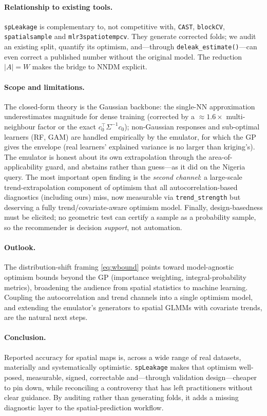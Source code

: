 \documentclass[11pt,a4paper]{article}
\begin{document}
\paragraph{Relationship to existing tools.} \texttt{spLeakage} is complementary to,
not competitive with, \texttt{CAST}, \texttt{blockCV}, \texttt{spatialsample} and
\texttt{mlr3spatiotempcv}. They generate corrected folds; we audit an existing split,
quantify its optimism, and---through \texttt{deleak\_estimate()}---can even correct a
published number without the original model. The reduction $\lvert A\rvert=W$ makes
the bridge to NNDM explicit.

\paragraph{Scope and limitations.} The closed-form theory is the Gaussian backbone:
the single-NN approximation underestimates magnitude for dense training (corrected
by a $\approx 1.6\times$ multi-neighbour factor or the exact $c_0^\top\Sigma^{-1}
c_0$); non-Gaussian responses and sub-optimal learners (RF, GAM) are handled
empirically by the emulator, for which the GP gives the envelope (real learners'
explained variance is no larger than kriging's). The emulator is honest about its own
extrapolation through the area-of-applicability guard, and abstains rather than
guess---as it did on the Nigeria query. The most important open finding is the
\emph{second channel}: a large-scale trend-extrapolation component of optimism that
all autocorrelation-based diagnostics (including ours) miss, now measurable via
\texttt{trend\_strength} but deserving a fully trend/covariate-aware optimism model.
Finally, design-basedness must be elicited; no geometric test can certify a sample
as a probability sample, so the recommender is decision \emph{support}, not
automation.

\paragraph{Outlook.} The distribution-shift framing \eqref{eq:wbound} points toward
model-agnostic optimism bounds beyond the GP (importance weighting,
integral-probability metrics), broadening the audience from spatial statistics to
machine learning. Coupling the autocorrelation and trend channels into a single
optimism model, and extending the emulator's generators to spatial GLMMs with
covariate trends, are the natural next steps.

\paragraph{Conclusion.} Reported accuracy for spatial maps is, across a wide range
of real datasets, materially and systematically optimistic. \texttt{spLeakage}
makes that optimism well-posed, measurable, signed, correctable and---through
validation design---cheaper to pin down, while reconciling a controversy that has
left practitioners without clear guidance. By auditing rather than generating folds,
it adds a missing diagnostic layer to the spatial-prediction workflow.
\end{document}
